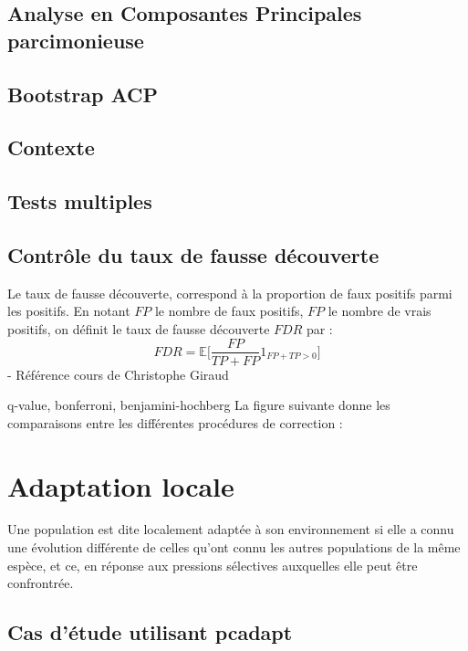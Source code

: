 \documentclass[12pt,twoside]{reedthesis}
\begin{document}
  \section{Analyse en Composantes Principales
  parcimonieuse}\label{analyse-en-composantes-principales-parcimonieuse}
  
  \section{Bootstrap ACP}\label{bootstrap-acp}
  
  \section{Contexte}\label{contexte}
  
  \section{Tests multiples}\label{tests-multiples}
  
  \section{Contrôle du taux de fausse
  découverte}\label{controle-du-taux-de-fausse-decouverte}
  
  Le taux de fausse découverte, correspond à la proportion de faux
  positifs parmi les positifs. En notant \(FP\) le nombre de faux
  positifs, \(FP\) le nombre de vrais positifs, on définit le taux de
  fausse découverte \(FDR\) par :
  \[ FDR = \mathbb{E}\Big[\frac{FP}{TP + FP} 1_{FP+TP > 0}\Big] \] -
  Référence cours de Christophe Giraud
  
  q-value, bonferroni, benjamini-hochberg La figure suivante donne les
  comparaisons entre les différentes procédures de correction :
  
  \chapter{Adaptation locale}\label{adaptation-locale}
  
  Une population est dite localement adaptée à son environnement si elle a
  connu une évolution différente de celles qu'ont connu les autres
  populations de la même espèce, et ce, en réponse aux pressions
  sélectives auxquelles elle peut être confrontrée.
  
  \section{Cas d'étude utilisant
  pcadapt}\label{cas-detude-utilisant-pcadapt}
  
\end{document}
